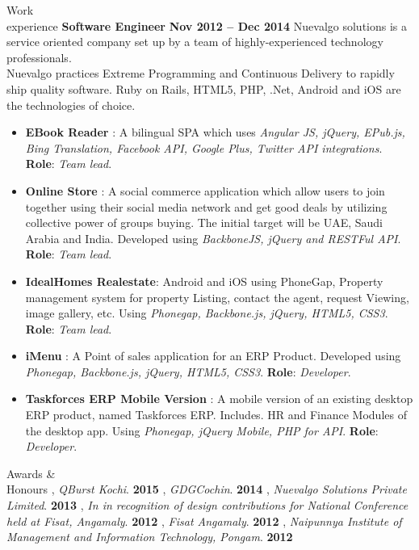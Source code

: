 \documentclass{resume}
\begin{document}
\begin{category}{Work \\experience}
  \citemnobullet \textbf{Software Engineer} \hfill \textbf{Nov 2012 -- Dec 2014}
  \citemnobullet Nuevalgo solutions is a service oriented company set up by a team of highly-experienced technology professionals. \\Nuevalgo practices Extreme Programming and Continuous
  Delivery to rapidly ship quality software. Ruby on Rails, HTML5, PHP, .Net, Android and iOS are the technologies of choice.
  \begin{itemize}
  \item \textbf{EBook Reader} : A bilingual SPA which uses {\em Angular JS, jQuery, EPub.js, Bing Translation, Facebook API, Google Plus, Twitter API integrations}. \textbf{Role}: {\em Team lead}. 
  \item \textbf{Online Store} : A social commerce application which allow users to join together using their social media network and get good deals by utilizing collective power of groups buying. The initial target will be UAE, Saudi Arabia and India. Developed using {\em BackboneJS, jQuery and RESTFul API}. \textbf{Role}: {\em Team lead}.
  \item \textbf{IdealHomes Realestate}: Android and iOS using PhoneGap, Property management system for property Listing, contact the agent, request Viewing, image gallery, etc. Using {\em Phonegap, Backbone.js, jQuery, HTML5, CSS3}. \textbf{Role}: {\em Team lead}.
  \item \textbf{iMenu} : A Point of sales application for an ERP Product. Developed using {\em Phonegap, Backbone.js, jQuery, HTML5, CSS3}. \textbf{Role}: {\em Developer}.
  \item \textbf{Taskforces ERP Mobile Version} : A mobile version of an existing desktop ERP product, named Taskforces ERP. Includes. HR and Finance Modules of the desktop app. Using{\em
      Phonegap, jQuery Mobile, PHP for API}. \textbf{Role}: {\em Developer}. 
  \end{itemize}
\end{category}


\begin{category}{Awards \&\\ Honours}
  , {\em QBurst Kochi}. \hfill \textbf{2015}
  , {\em GDGCochin}. \hfill \textbf{2014}
  , {\em Nuevalgo Solutions Private Limited}. \hfill \textbf{2013}
  , {\em  In in recognition of design contributions for National Conference held at Fisat, Angamaly}. \hfill \textbf{2012}
  , {\em Fisat Angamaly}. \hfill \textbf{2012}
  , {\em  Naipunnya  Institute  of  Management  and  Information  Technology, Pongam}. \hfill \textbf{2012}
\end{category}
\end{document}
